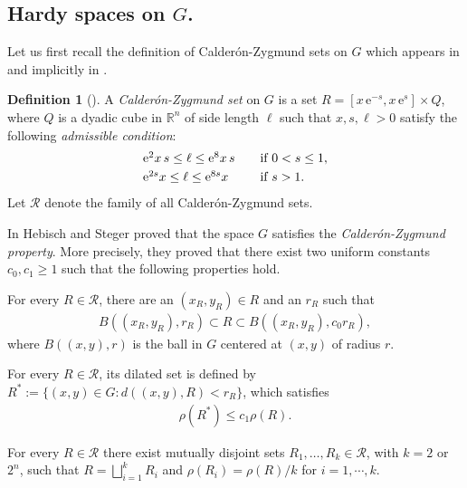 \documentclass[a4paper,12pt]{amsart}
\numberwithin{equation}{section}
\theoremstyle{definition}
\newtheorem{definition}[theorem]{Definition}
\theoremstyle{remark}
\numberwithin{theorem}{section}
\newcommand{\R}{\mathbb{R}}
\newcommand{\e}{\mathrm{e}}
\newcommand{\SR}{\mathscr{R}}
\begin{document}
\subsection{Hardy spaces on \texorpdfstring{$G$}{G}.}\label{subsec2.2} Let us first recall the definition of Calder\'{o}n-Zygmund sets on $G$ which appears in \cite{HeSt} and implicitly in \cite{GiSj}.
\begin{definition}[{\cite[Definition 2.1]{Va}}]\label{def2.3}
A \emph{Calder\'{o}n-Zygmund set} on $G$ is a set $R=[x\,\e^{-s},x\,\e^s]\times Q$, where $Q$ is a dyadic cube in $\R^n$ of side length $\ell$ such that $x,s,\ell>0$ satisfy the following \emph{admissible condition}:
\begin{align*}
\begin{array}{lll}
\e^2x\,s\leq \ell\leq \e^8x\,s & &\mbox{if }0<s\leq 1,\smallskip\\
\e^{2s}x\leq \ell\leq \e^{8s}x & &\mbox{if }s>1.
\end{array}
\end{align*}
Let $\SR$ denote the family of all Calder\'{o}n-Zygmund sets.
\end{definition}
In \cite{HeSt} Hebisch and Steger proved that the space $G$ satisfies the \emph{Calder\'{o}n-Zygmund property}. More precisely, they proved that there exist two uniform constants $c_0,c_1\geq 1$ such that the following properties hold.
\begin{asparaitem}
\item For every $R\in\SR$, there are an $(x_R,y_R)\in R$ and an $r_R$ such that
\begin{align}\label{e2.12}
B((x_R,y_R),r_R)\subset R\subset B((x_R,y_R),c_0r_R),
\end{align}
where $B((x,y),r)$ is the ball in $G$ centered at $(x,y)$ of radius $r$.
\item For every $R\in\SR$, its dilated set is defined by $R^*:=\{(x,y)\in G:d((x,y),R)<r_R\}$, which satisfies
\begin{align*}
\rho(R^*)\leq c_1\rho(R).
\end{align*}
\item For every $R\in\SR$ there exist mutually disjoint sets $R_1,\dots,R_k\in\SR$, with $k=2$ or $2^n$, such that $R=\bigsqcup_{i=1}^kR_i$ and $\rho(R_i)=\rho(R)/k$ for $i=1,\cdots,k$.
\end{asparaitem}
\end{document}
